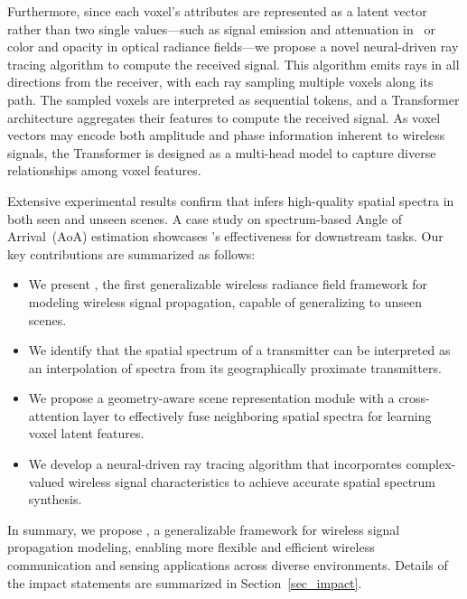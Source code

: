 Furthermore, since each voxel's attributes are represented as a latent vector rather than two single values—such as signal emission and attenuation in \nerft~or color and opacity in optical radiance fields—we propose a novel neural-driven ray tracing algorithm to compute the received signal.
This algorithm emits rays in all directions from the receiver, with each ray sampling multiple voxels along its path. 
The sampled voxels are interpreted as sequential tokens, and a Transformer architecture aggregates their features to compute the received signal.
As voxel vectors may encode both amplitude and phase information inherent to wireless signals, the Transformer is designed as a multi-head model to capture diverse relationships among voxel features.



Extensive experimental results confirm that \ourSystem infers high-quality spatial spectra in both seen and unseen scenes. 
A case study on spectrum-based Angle of Arrival~(AoA) estimation showcases \ourSystem's effectiveness for downstream tasks.
Our key contributions are summarized as follows:

\begin{itemize}[leftmargin=*, align=left]

\item We present \ourSystem, the first generalizable wireless radiance field framework for modeling wireless signal propagation, capable of generalizing to unseen scenes.


\item We identify that the spatial spectrum of a transmitter can be interpreted as an interpolation of spectra from its geographically proximate transmitters.


\item We propose a geometry-aware scene representation module with a cross-attention layer to effectively fuse neighboring spatial spectra for learning voxel latent features.


\item We develop a neural-driven ray tracing algorithm that incorporates complex-valued wireless signal characteristics to achieve accurate spatial spectrum synthesis.

\end{itemize}

In summary, we propose \ourSystem, a generalizable framework for wireless signal propagation modeling, enabling more flexible and efficient wireless communication and sensing applications across diverse environments. 
Details of the impact statements are summarized in Section~\ref{sec_impact}.




